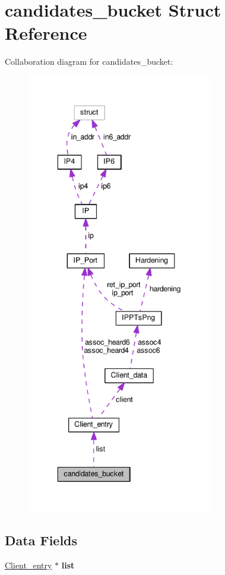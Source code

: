 \hypertarget{structcandidates__bucket}{\section{candidates\+\_\+bucket Struct Reference}
\label{structcandidates__bucket}
}


Collaboration diagram for candidates\+\_\+bucket\+:\nopagebreak
\begin{figure}[H]
\begin{center}
\leavevmode
\includegraphics[height=550pt]{structcandidates__bucket__coll__graph}
\end{center}
\end{figure}
\subsection*{Data Fields}
\begin{DoxyCompactItemize}
\item 
\hypertarget{structcandidates__bucket_a515f2b5e53003e623b334ab90c4280e0}{\hyperlink{struct_client__entry}{Client\+\_\+entry} $\ast$ {\bfseries list}}\label{structcandidates__bucket_a515f2b5e53003e623b334ab90c4280e0}

\end{DoxyCompactItemize}


